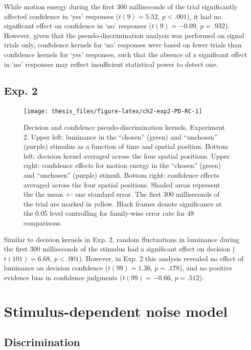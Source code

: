 \documentclass[12pt,twoside]{reedthesis}
\begin{document}
While motion energy during the first 300 milliseconds of the trial significantly affected confidence in `yes' responses (\(t(9) = 5.52\), \(p < .001\)), it had no significant effect on confidence in `no' responses (\(t(9) = -0.09\), \(p = .932\)). However, given that the pseudo-discrimination analysis was performed on signal trials only, confidence kernels for `no' responses were based on fewer trials than confidence kernels for `yes' responses, such that the absence of a significant effect in `no' responses may reflect insufficient statistical power to detect one.

\hypertarget{exp.-2}{%
\subsection{Exp. 2}\label{exp.-2}}


\begin{figure}
\texttt{[image: thesis\_files/figure-latex/ch2-exp2-PD-RC-1]} \caption[Pseudo-discrimination kernels for detection signal trials.]{Decision and confidence pseudo-discrimination kernels, Experiment 2. Upper left: luminance in the ``chosen'' (green) and ``unchosen'' (purple) stimulus as a function of time and spatial position. Bottom left: decision kernel averaged across the four spatial positions. Upper right: confidence effects for motion energy in the ``chosen'' (green) and ``unchosen'' (purple) stimuli. Bottom right: confidence effects averaged across the four spatial positions. Shaded areas represent the the mean +- one standard error. The first 300 milliseconds of the trial are marked in yellow. Black frames denote significance at the 0.05 level controlling for family-wise error rate for 48 comparisons.}\label{fig:ch2-exp2-PD-RC}
\end{figure}
Similar to decision kernels in Exp. 2, random fluctuations in luminance during the first 300 milliseconds of the stimulus had a significant effect on decision (\(t(101) = 6.68\), \(p < .001\)). However, in Exp. 2 this anslysis revealed no effect of luminance on decision confidence (\(t(99) = 1.36\), \(p = .178\)), and no positive evidence bias in confidence judgments (\(t(99) = -0.66\), \(p = .512\)).

\hypertarget{app2:simulation}{%
\section{Stimulus-dependent noise model}\label{app2:simulation}}

\hypertarget{discrimination}{%
\subsection{Discrimination}\label{discrimination}}
\end{document}
